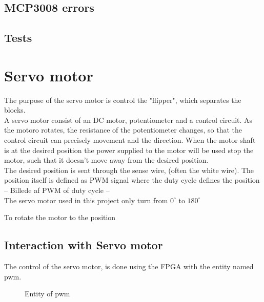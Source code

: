\documentclass[10pt,a4paper]{article}
\begin{document}
\subsection{MCP3008 errors}
\subsection{Tests}

\section{Servo motor}
The purpose of the servo motor is control the "flipper", which separates the blocks. \\


A servo motor consist of an DC motor, potentiometer and a control circuit.  As the motoro rotates, the resistance of the potentiometer changes,  so that the control circuit can precisely movement and the direction.   When the motor shaft is at the desired position the power supplied to the motor will be used stop the motor, such that it doesn't move away from the desired position. \\

The desired position is sent through the sense wire, (often the white wire). The position  itself is defined as PWM signal where the duty cycle defines the position\\
 

-- Billede af PWM of duty cycle --  \\

The servo motor used in this project only turn from $0^{\circ}$ to $180^{\circ}$

To rotate the motor to the position 
\subsection{Interaction with Servo motor}
The control of the servo motor, is done using the FPGA with the entity named pwm. 

\begin{figure}[htb]
\centering
{}
\caption{Entity of pwm}
\end{figure}
\end{document}
